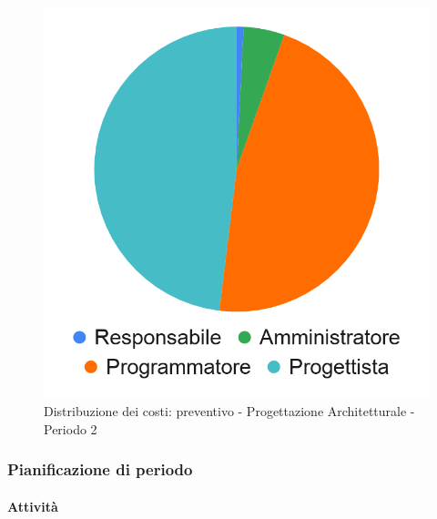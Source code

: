 \hspace{-1cm}
\begin{minipage}{.50\textwidth}
\smallPreventivoTable{
	
}
\end{minipage}
\hspace{1cm}
\begin{minipage}{.40\textwidth}
\begin{figure}[H]
	\includegraphics[scale=0.21]{res/images/charts/preventivo_priori/Grafico4-4.png}
	\caption{Distribuzione dei costi: preventivo - Progettazione Architetturale - Periodo 2}
\end{figure}
\end{minipage} 



\subsubsection{Pianificazione di periodo}


\paragraph{Attività}
\subparagraph*{}

